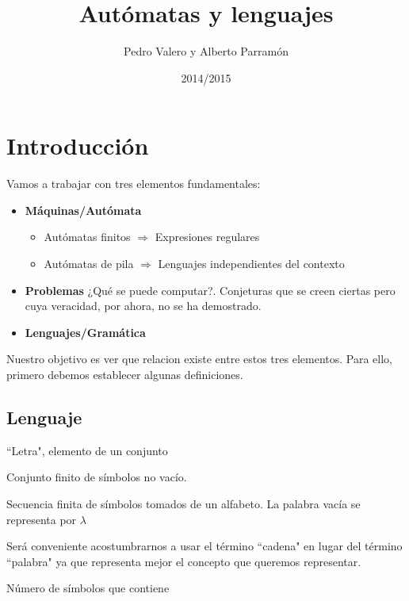 \documentclass{apuntes}
\title{Autómatas y lenguajes}
\author{Pedro Valero y Alberto Parramón}
\date{2014/2015}
\begin{document}
\pagestyle{plain}

\maketitle
\tableofcontents
\newpage

\printindex

\chapter{Introducción}
Vamos a trabajar con tres elementos fundamentales:
\begin{itemize}
\item \textbf{Máquinas/Autómata}
\begin{itemize}
\item Autómatas finitos $\Rightarrow$ Expresiones regulares
\item Autómatas de pila $\Rightarrow$ Lenguajes independientes del contexto
\end{itemize}
\item \textbf{Problemas} ¿Qué se puede computar?. Conjeturas que se creen ciertas pero cuya veracidad, por ahora, no se ha demostrado.

\item \textbf{Lenguajes/Gramática}
\end{itemize}

Nuestro objetivo es ver que relacion existe entre estos tres elementos. Para ello, primero debemos establecer algunas definiciones.

\section{Lenguaje}
\begin{defn}[Símbolo]
``Letra", elemento de un conjunto
\end{defn}

\begin{defn}[Alfabeto]
Conjunto finito de símbolos no vacío.
\end{defn}

\begin{defn}
Secuencia finita de símbolos tomados de un alfabeto.
La palabra vacía se representa por $\lambda$
\end{defn}
Será conveniente acostumbrarnos a usar el término ``cadena" en lugar del término ``palabra" ya que representa mejor el concepto que queremos representar.


\begin{defn}
Número de símbolos que contiene
\end{defn}
\end{document}
